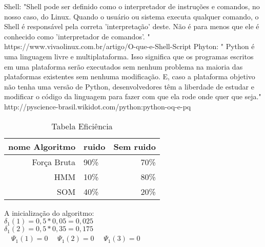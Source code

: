 
\quad 
Shell: "Shell pode ser definido como o interpretador de instruções e comandos, no nosso caso, do Linux. Quando o usuário ou sistema executa qualquer comando, o Shell é responsável pela correta 'interpretação' deste. Não é para menos que ele é conhecido como 'interpretador de comandos'. "
\quad https://www.vivaolinux.com.br/artigo/O-que-e-Shell-Script
\quad 
\quad Phyton: " Python é uma linguagem livre e multiplataforma. Isso significa que os programas escritos em uma plataforma serão executados sem nenhum problema na maioria das plataformas existentes sem nenhuma modificação. E, caso a plataforma objetivo não tenha uma versão de Python, desenvolvedores têm a liberdade de estudar e modificar o código da linguagem para fazer com que ela rode onde quer que seja."
\quad http://pyscience-brasil.wikidot.com/python:python-oq-e-pq
\quad 
\begin{table}[h]
\caption {Tabela Eficiência}
\begin {tabular}{r|lr}
nome Algoritmo & ruido & Sem ruido\\

\hline Força Bruta & 90\%&70\%\\
\hline HMM &10\% &80\%\\
\hline SOM &40\%&20\%\\
\end {tabular}
\end{table}

A inicialização do algoritmo:\\
$\delta_1 (1) = 0,5 * 0,05 = 0,025$ \\
$\delta_1 (2) = 0,5 * 0,35 = 0,175$ \\

$\quad \Psi_1 (1) = 0$
$\quad \Psi_1 (2) = 0$
$\quad \Psi_1 (3) = 0$\\

